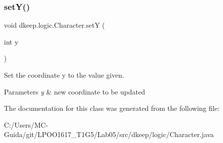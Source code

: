 \subsubsection{\texorpdfstring{set\+Y()}{setY()}}
{\footnotesize\ttfamily void dkeep.\+logic.\+Character.\+setY (\begin{DoxyParamCaption}\item[{int}]{y }\end{DoxyParamCaption})}

Set the coordinate y to the value given. 
\begin{DoxyParams}{Parameters}
{\em y} & new coordinate to be updated \\
\hline
\end{DoxyParams}


The documentation for this class was generated from the following file\+:\begin{DoxyCompactItemize}
\item 
C\+:/\+Users/\+M\+C-\/\+Guida/git/\+L\+P\+O\+O1617\+\_\+\+T1\+G5/\+Lab05/src/dkeep/logic/Character.\+java\end{DoxyCompactItemize}
